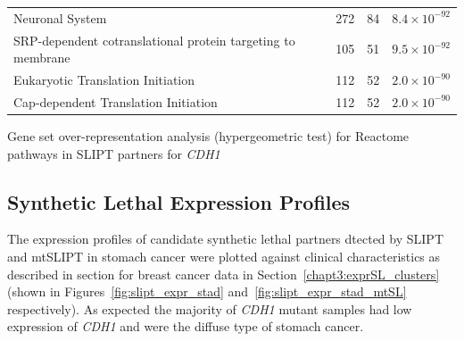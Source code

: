 \begin{table}[!ht]
{\begin{threeparttable}
\begin{tabular}{lccc}
  \rowcolor{black!10}
  Neuronal System & 272 &  84 & $8.4 \times 10^{-92}$ \\ 
  \rowcolor{black!5}
  SRP-dependent cotranslational protein targeting to membrane & 105 &  51 & $9.5 \times 10^{-92}$ \\ 
  \rowcolor{black!10}
  Eukaryotic Translation Initiation & 112 &  52 & $2.0 \times 10^{-90}$ \\ 
  \rowcolor{black!5}
  Cap-dependent Translation Initiation & 112 &  52 & $2.0 \times 10^{-90}$ \\ 
   \hline
\end{tabular}
\begin{tablenotes}
\raggedright \small
Gene set over-representation analysis (hypergeometric test) for Reactome pathways in \gls{SLIPT} partners for \textit{CDH1}
\end{tablenotes}
\end{threeparttable}
}
\end{table}



\FloatBarrier

\subsection{Synthetic Lethal Expression Profiles} \label{chapt3:stad_SL_clusters}

The expression profiles of candidate synthetic lethal partners dtected by \gls{SLIPT} and mtSLIPT in stomach cancer were plotted against clinical characteristics as described in section for breast cancer data in Section~\ref{chapt3:exprSL_clusters} (shown in Figures~\ref{fig:slipt_expr_stad} and~\ref{fig:slipt_expr_stad_mtSL} respectively). As expected the majority of \textit{CDH1} mutant samples had low expression of \textit{CDH1} and were the diffuse type of stomach cancer.



